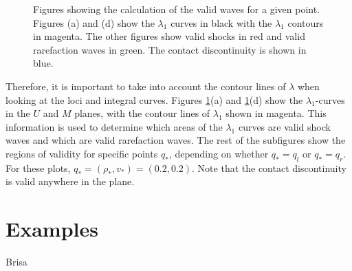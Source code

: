 \documentclass{article}
\begin{document}
\begin{figure}[h!]
{   }
 \label{fig:AW_validity}
 \caption[Optional caption for list of figures]
 {Figures showing the calculation of the valid waves for a given point. Figures (a)
  and (d) show the $\lambda_1$ curves in black with the $\lambda_1$ contours 
  in magenta. The other figures show valid shocks in red and valid rarefaction 
  waves in green. The contact discontinuity is shown in blue.}
\end{figure}

Therefore, it is important to take into account the contour lines of $\lambda$ when 
looking at the loci and integral curves. Figures \ref{fig:AW_validity}(a) and 
\ref{fig:AW_validity}(d) show the $\lambda_1$-curves in the $U$ and $M$ planes,
with the contour lines of $\lambda_1$ shown in magenta. This information is used
to determine which areas of the $\lambda_1$ curves are valid shock waves and which
are valid rarefaction waves. The rest of the subfigures show the regions of validity for 
specific points $q_*$, depending on whether $q_* = q_l$ or $q_* = q_r$. For these plots,
$q_* = (\rho_*,v_*) = (0.2, 0.2)$. Note that the contact discontinuity is valid
anywhere in the plane. 

\section{Examples}
Brisa

{}

\end{document}
